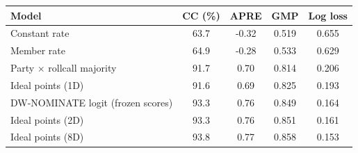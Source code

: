 \begin{tabular}{lcccc}
\toprule
Model & CC (\%) & APRE & GMP & Log loss \\
\midrule
Constant rate & 63.7 & -0.32 & 0.519 & 0.655 \\
Member rate & 64.9 & -0.28 & 0.533 & 0.629 \\
Party $\times$ rollcall majority & 91.7 & 0.70 & 0.814 & 0.206 \\
Ideal points (1D) & 91.6 & 0.69 & 0.825 & 0.193 \\
DW-NOMINATE logit (frozen scores) & 93.3 & 0.76 & 0.849 & 0.164 \\
Ideal points (2D) & 93.3 & 0.76 & 0.851 & 0.161 \\
Ideal points (8D) & 93.8 & 0.77 & 0.858 & 0.153 \\
\bottomrule
\end{tabular}
